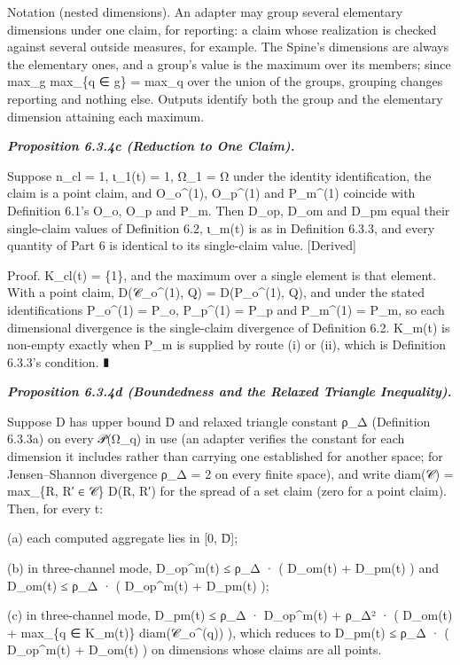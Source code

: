 \documentclass[
]{article}
\begin{document}
Notation (nested dimensions). An adapter may group several elementary
dimensions under one claim, for reporting: a claim whose realization is
checked against several outside measures, for example. The Spine's
dimensions are always the elementary ones, and a group's value is the
maximum over its members; since max\_g max\_\{q ∈ g\} = max\_q over the
union of the groups, grouping changes reporting and nothing else.
Outputs identify both the group and the elementary dimension attaining
each maximum.

\emph{\textbf{Proposition 6.3.4c (Reduction to One Claim).}}

Suppose n\_cl = 1, ι\_1(t) = 1, Ω\_1 = Ω under the identity
identification, the claim is a point claim, and O\_o\^{}(1), O\_p\^{}(1)
and P\_m\^{}(1) coincide with Definition 6.1's O\_o, O\_p and P\_m. Then
D\_op, D\_om and D\_pm equal their single-claim values of Definition
6.2, ι\_m(t) is as in Definition 6.3.3, and every quantity of Part 6 is
identical to its single-claim value. {[}Derived{]}

Proof. K\_cl(t) = \{1\}, and the maximum over a single element is that
element. With a point claim, D(𝒞\_o\^{}(1), Q) = D(P\_o\^{}(1), Q), and
under the stated identifications P\_o\^{}(1) = P\_o, P\_p\^{}(1) = P\_p
and P\_m\^{}(1) = P\_m, so each dimensional divergence is the
single-claim divergence of Definition 6.2. K\_m(t) is non-empty exactly
when P\_m is supplied by route (i) or (ii), which is Definition 6.3.3's
condition. ∎

\emph{\textbf{Proposition 6.3.4d (Boundedness and the Relaxed Triangle
Inequality).}}

Suppose D has upper bound D̄ and relaxed triangle constant ρ\_Δ
(Definition 6.3.3a) on every 𝒫(Ω\_q) in use (an adapter verifies the
constant for each dimension it includes rather than carrying one
established for another space; for Jensen--Shannon divergence ρ\_Δ = 2
on every finite space), and write diam(𝒞) = max\_\{R, R′ ∈ 𝒞\} D(R, R′)
for the spread of a set claim (zero for a point claim). Then, for every
t:

(a) each computed aggregate lies in {[}0, D̄{]};

(b) in three-channel mode, D\_op\^{}m(t) ≤ ρ\_Δ · ( D\_om(t) + D\_pm(t)
) and D\_om(t) ≤ ρ\_Δ · ( D\_op\^{}m(t) + D\_pm(t) );

(c) in three-channel mode, D\_pm(t) ≤ ρ\_Δ · D\_op\^{}m(t) + ρ\_Δ² · (
D\_om(t) + max\_\{q ∈ K\_m(t)\} diam(𝒞\_o\^{}(q)) ), which reduces to
D\_pm(t) ≤ ρ\_Δ · ( D\_op\^{}m(t) + D\_om(t) ) on dimensions whose
claims are all points.
\end{document}

